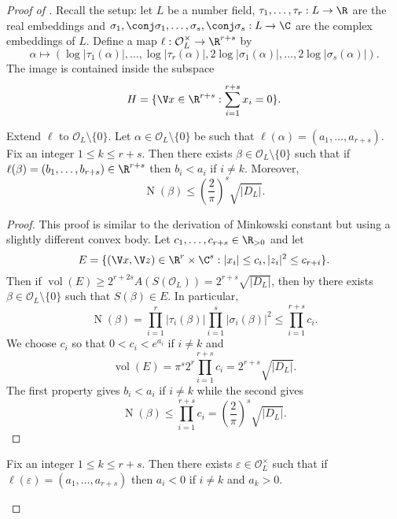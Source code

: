 \documentclass[a4paper]{article}
\renewcommand*{\O}{\mathcal{O}}
\DeclareMathOperator{\n}{N}
\DeclareMathOperator{\vol}{vol}
\begin{document}
\begin{proof}[Proof of ]
  Recall the setup: let \(L\) be a number field, \(\tau_1, \dots, \tau_r: L \to \R\) are the real embeddings and \(\sigma_1, \conj \sigma_1, \dots, \sigma_s, \conj \sigma_s: L \to \C\) are the complex embeddings of \(L\). Define a map \(\ell: \O_L^\times \to \R^{r + s}\) by
  \[
    \alpha \mapsto (\log |\tau_1(\alpha)|, \dots, \log |\tau_r(\alpha)|, 2\log |\sigma_1(\alpha)|, \dots, 2\log |\sigma_s(\alpha)|).
  \]
  The image is contained inside the subspace
  \[
    H = \{ \V x \in \R^{r + s}: \sum_{i = 1}^{r + s} x_i = 0\}.
  \]

  \begin{lemma}
    Extend \(\ell\) to \(\O_L \setminus \{0\}\). Let \(\alpha \in \O_L \setminus \{0\}\) be such that \(\ell(\alpha) = (a_1, \dots, a_{r + s})\). Fix an integer \(1 \leq k \leq r + s\). Then there exists \(\beta \in \O_L \setminus \{0\}\) such that if \(\ell(\beta) = (b_1, \dots, b_{r + s}) \in \R^{r + s}\) then \(b_i < a_i\) if \(i \neq k\). Moreover,
    \[
      \n(\beta) \leq \left( \frac{2}{\pi} \right)^s \sqrt{|D_L|}.
    \]
  \end{lemma}

  \begin{proof}
    This proof is similar to the derivation of Minkowski constant but using a slightly different convex body. Let \(c_1, \dots, c_{r + s} \in \R_{> 0}\) and let
    \[
      E = \{(\V x, \V z) \in \R^r \times \C^s: |x_i| \leq c_i, |z_i|^2 \leq c_{r + i}\}.
    \]
    Then if \(\vol(E) \geq 2^{r + 2s} A(S(\O_L)) = 2^{r + s} \sqrt{|D_L|}\), then by  there exists \(\beta \in \O_L \setminus \{0\}\) such that \(S(\beta) \in E\). In particular,
    \[
      \n(\beta) = \prod_{i = 1}^r |\tau_i(\beta)| \prod_{i = 1}^s |\sigma_i(\beta)|^2 \leq \prod_{i = 1}^{r + s} c_i.
    \]
    We choose \(c_i\) so that \(0 < c_i < e^{a_i}\) if \(i \neq k\) and
    \[
      \vol(E) = \pi^s 2^r \prod_{i = 1}^{r + s} c_i = 2^{r + s} \sqrt{|D_L|}.
    \]
    The first property gives \(b_i < a_i\) if \(i \neq k\) while the second gives
    \[
      \n(\beta) \leq \prod_{i = 1}^{r + s} c_i = \left( \frac{2}{\pi} \right)^s \sqrt{|D_L|}.
    \]
  \end{proof}

  \begin{corollary}
    \label{cor:Dirichlet corollary 2}
    Fix an integer \(1 \leq k \leq r + s\). Then there exists \(\varepsilon \in \O_L^\times\) such that if \(\ell(\varepsilon) = (a_1, \dots, a_{r + s})\) then \(a_i < 0\) if \(i \neq k\) and \(a_k > 0\).
  \end{corollary}


\end{proof}
\end{document}
